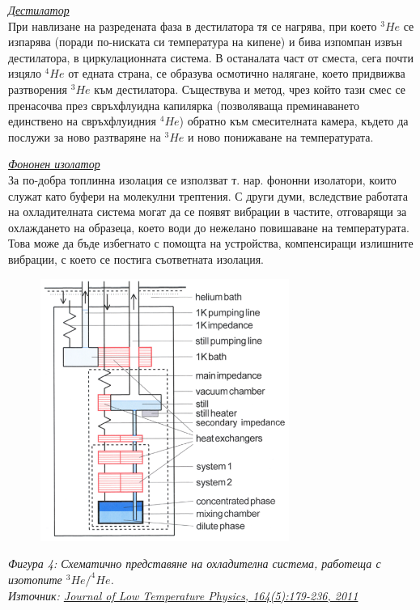    \vspace{3mm}

    \normalsize{\textit{\underline{Дестилатор}}}\\

    При навлизане на разредената фаза в дестилатора тя се нагрява, при което $^{3}He$ се изпарява (поради по-ниската си температура на кипене) и бива изпомпан извън дестилатора, в циркулационната
    система. В останалата част от сместа, сега почти изцяло $^{4}He$ от едната страна, се образува осмотично налягане, което придвижва разтворения $^{3}He$ към дестилатора. Съществува и метод, чрез
    който тази смес се пренасочва през свръхфлуидна капилярка (позволяваща преминаването единствено на свръхфлуидния $^{4}He$) обратно към смесителната камера, където да послужи за ново разтваряне
    на $^{3}He$ и ново понижаване на температурата. \cite{martin2010closed}

    \vspace{3mm}

    \normalsize{\textit{\underline{Фононен изолатор}}}\\

    За по-добра топлинна изолация се използват т. нар. фононни изолатори, които служат като буфери на молекулни трептения. С други думи, вследствие работата на охладителната система могат да се появят
    вибрации в частите, отговарящи за охлаждането на образеца, което води до нежелано повишаване на температурата. Това може да бъде избегнато с помощта на устройства, компенсиращи излишните вибрации,
    с което се постига съответната изолация.

    \begin{figure}[H]
        \centering
        \includegraphics[width=230pt]{2.png}
    \end{figure}
    \begin{center}
        \small \textit{Фигура 4: Схематично представяне на охладителна система, работеща с изотопите $^{3}He/^{4}He$.\\
        Източник: \href{https://link.springer.com/content/pdf/10.1007/s10909-011-0373-x.pdf}{Journal of Low Temperature Physics, 164(5):179-236, 2011}}\cite{de2011basic}
    \end{center}


